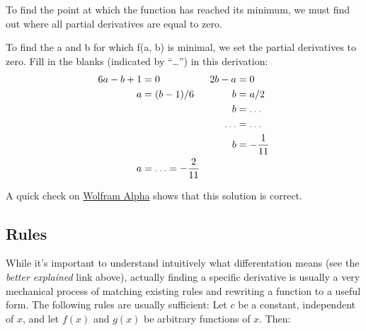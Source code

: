 \documentclass[11pt]{article}
\begin{document}

To find the point at which the function has reached its minimum, we must find out where all partial derivatives are equal to zero.\footnotemark
{}

\begin{Exercise} To find the a and b for which f(a, b) is minimal, we set the partial derivatives to zero. Fill in the blanks (indicated by ``\ldots'') in this derivation:
\begin{align*}
6a - b + 1 &= 0 & 2b-a &= 0 \\
a &= (b-1)/6 & b &= a/2 \\
 & & b &= \ans{\frac{b-1}{6}\frac{1}{2}}{\dots}\\ 
 & & \ans{b - \frac{b}{12}}{\ldots}&= \ans{- \frac{1}{12}}{\ldots}\\
  & & b &= -\frac{1}{11}\\
  a &= \ans{\frac{-\frac{1}{11} - 1}{6}}{\ldots}=-\frac{2}{11} & & \\
\end{align*}
\end{Exercise}

\noindent A quick check on \href{http://wolfr.am/9DrZFKcR}{Wolfram Alpha} shows that this solution is correct.

\subsection{Rules}

While it's important to understand intuitively what differentation means (see the \emph{better explained} link above), actually finding a specific derivative is usually a very mechanical process of matching existing rules and rewriting a function to a useful form. The following rules are usually sufficient:
Let $c$ be a constant, independent of $x$, and let $f(x)$ and $g(x)$ be arbitrary functions of $x$. Then:
\end{document}
